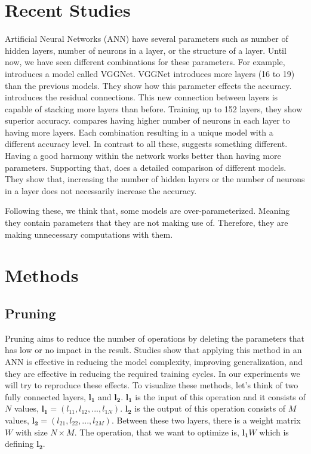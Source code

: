 \documentclass[a4paper,man,natbib]{apa6}
\begin{document}
\section{Recent Studies}
Artificial Neural Networks (ANN) have several parameters such as number of hidden layers, number of neurons in a layer, or the structure of a layer. Until now, we have seen different combinations for these parameters. For example, \cite{Simonyan:2014aa} introduces a model called VGGNet. VGGNet introduces more layers (16 to 19) than the previous models. They show how this parameter effects the accuracy. \cite{He:2015aa} introduces the residual connections. This new connection between layers is capable of stacking more layers than before. Training up to 152 layers, they show superior accuracy. \cite{Zagoruyko:2016aa} compares having higher number of neurons in each layer to having more layers. Each combination resulting in a unique model with a different accuracy level. In contrast to all these, \cite{Szegedy:2014aa} suggests something different. Having a good harmony within the network works better than having more parameters. Supporting that, \cite{Canziani:2016aa} does a detailed comparison of different models. They show that, increasing the number of hidden layers or the number of neurons in a layer does not necessarily increase the accuracy. 

Following these, we think that, some models are over-parameterized. Meaning they contain parameters that they are not making use of. Therefore, they are making unnecessary computations with them.


\section{Methods}
\subsection{Pruning}
Pruning aims to reduce the number of operations by deleting the parameters that has low or no impact in the result. Studies show that applying this method in an ANN is effective in reducing the model complexity, improving generalization, and they are effective in reducing the required training cycles. In our experiments we will try to reproduce these effects.
To visualize these methods, let's think of two fully connected layers, $\mathbf{l_1}$ and $\mathbf{l_2}$. $\mathbf{l_1}$ is the input of this operation and it consists of $N$ values, $\mathbf{l_1}=(l_{11}, l_{12}, ..., l_{1N})$. $\mathbf{l_2}$ is the output of this operation consists of $M$ values, $\mathbf{l_2}=(l_{21}, l_{22}, ..., l_{2M})$. Between these two layers, there is a weight matrix $W$ with size $N \times M$. The operation, that we want to optimize is, $\mathbf{l_1}W$ which is defining $\mathbf{l_2}$.
\end{document}
